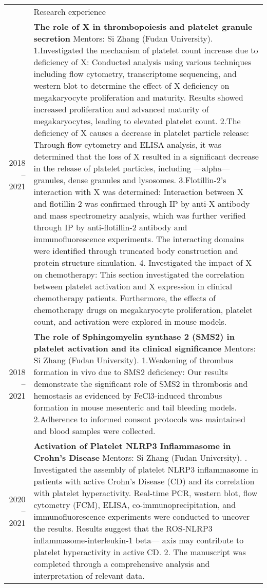 \documentclass[letterpaper, 11pt]{article}
\newcommand{\headingfont}{\Large\color{OliveGreen}}
\newenvironment{SectionTable}[1]{
	\renewcommand*{\arraystretch}{1.7}
	\setlength{\tabcolsep}{10pt}
	\begin{longtable}{Rp{5.2in}} & #1 \\}
{\end{longtable}\vspace{-.3cm}}
\begin{document}
\begin{SectionTable}{\headingfont Research experience}
2018 -- 2021 &
\textbf{The role of X in thrombopoiesis and platelet granule secretion} \newline
Mentors: Si Zhang (Fudan University). \newline
1.Investigated the mechanism of platelet count increase due to deficiency of X: Conducted analysis using various techniques including flow cytometry, transcriptome sequencing, and western blot to determine the effect of X deficiency on megakaryocyte proliferation and maturity. Results showed increased proliferation and advanced maturity of megakaryocytes, leading to elevated platelet count.
2.The deficiency of X causes a decrease in platelet particle release: Through flow cytometry and ELISA analysis, it was determined that the loss of X resulted in a significant decrease in the release of platelet particles, including ---alpha--- granules, dense granules and lysosomes.
3.Flotillin-2's interaction with X was determined: Interaction between X and flotillin-2 was confirmed through IP by anti-X antibody and mass spectrometry analysis, which was further verified through IP by anti-flotillin-2 antibody and immunofluorescence experiments. The interacting domains were identified through truncated body construction and protein structure simulation.
4.  Investigated the impact of X on chemotherapy: This section investigated the correlation between platelet activation and X expression in clinical chemotherapy patients. Furthermore,  the effects of chemotherapy drugs on megakaryocyte proliferation, platelet count, and activation were explored in mouse models.  \\

2018 -- 2021 &
\textbf{The role of Sphingomyelin synthase 2 (SMS2) in platelet activation and its clinical significance} \newline
Mentors:  Si Zhang (Fudan University). \newline
1.Weakening of thrombus formation in vivo due to SMS2 deficiency: Our results demonstrate the significant role of SMS2 in thrombosis and hemostasis as evidenced by FeCl3-induced thrombus formation in mouse mesenteric and tail bleeding models.
2.Adherence to informed consent protocols was maintained and blood samples were collected. \\

2020 -- 2021 &
\textbf{Activation of Platelet NLRP3 Inflammasome in Crohn’s Disease} \newline
Mentors: Si Zhang (Fudan University). . Investigated the assembly of platelet NLRP3 inflammasome in patients with active Crohn's Disease (CD) and its correlation with platelet hyperactivity. Real-time PCR, western blot, flow cytometry (FCM), ELISA, co-immunoprecipitation, and immunofluorescence experiments were conducted to uncover the results. Results suggest that the ROS-NLRP3 inflammasome-interleukin-1 beta--- axis may contribute to platelet hyperactivity in active CD.
2. The manuscript was completed through a comprehensive analysis and interpretation of relevant data.  \\


\end{SectionTable}
\end{document}
